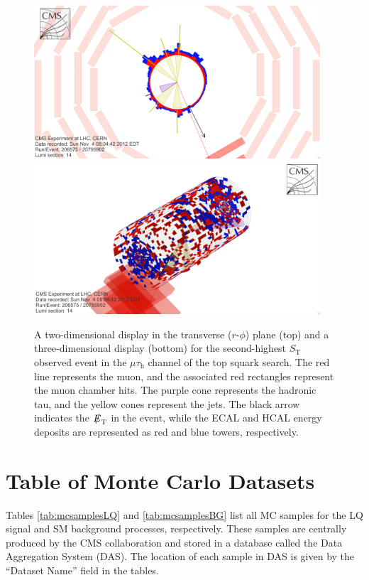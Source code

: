 \documentclass[12pt]{thesis}  %
\newcommand{\tauh}{\ensuremath{\tau_{\text{h}}}\xspace}
\newcommand{\mutau}{\ensuremath{\mu\tauh}\xspace}
\def\eslash{\ensuremath{{\hbox{$E$\kern-0.6em\lower-.05ex\hbox{/}\kern0.10em}}}}
\def\met{\mbox{$\eslash_\text{T}$}\xspace} %
\def\ST{\ensuremath{S_{\text{T}}}\xspace}
\begin{document}
\begin{figure}[hbtp]
\begin{center}
\includegraphics[width=0.95\textwidth]{figures/eventdisplays/LQD_evt2_rphi.png}
\includegraphics[width=0.95\textwidth]{figures/eventdisplays/LQD_evt2_3D.png}
\caption{A two-dimensional display in the transverse ($r$-$\phi$) plane (top) and a three-dimensional display (bottom) for the second-highest \ST observed event in the \mutau channel of the top squark search. The red line represents the muon, and the associated red rectangles represent the muon chamber hits. The purple cone represents the hadronic tau, and the yellow cones represent the jets. The black arrow indicates the \met in the event, while the ECAL and HCAL energy deposits are represented as red and blue towers, respectively. }
\label{fig:lqd-evt2}
\end{center}
\end{figure}
\chapter{Table of Monte Carlo Datasets
\label{ch:datasets}}

Tables \ref{tab:mcsamplesLQ} and \ref{tab:mcsamplesBG} list all MC samples for the LQ signal and SM background processes, respectively. These samples are centrally produced by the CMS collaboration and stored in a database called the Data Aggregation System (DAS). The location of each sample in DAS is given by the ``Dataset Name'' field in the tables.
\end{document}
